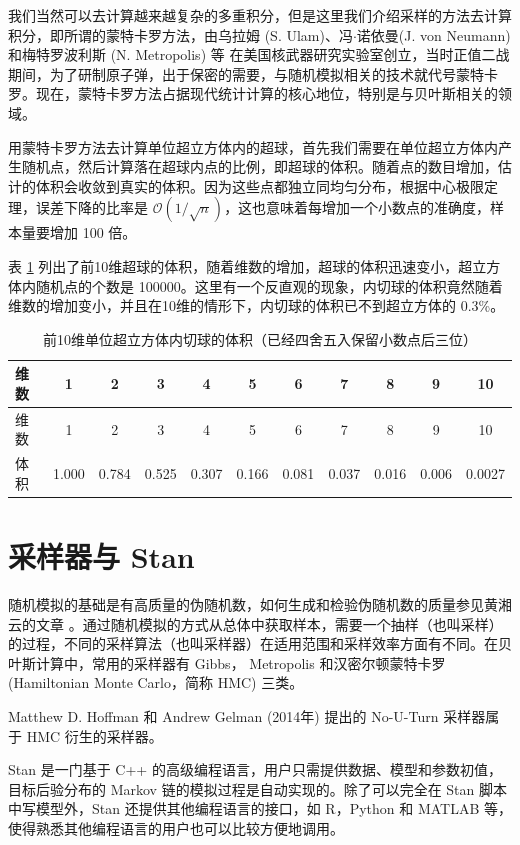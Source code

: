 \documentclass[12pt,a4paper,UTF8,twoside]{book}
\theoremstyle{definition}
\theoremstyle{definition}
\theoremstyle{definition}
\theoremstyle{remark}
\begin{document}
我们当然可以去计算越来越复杂的多重积分，但是这里我们介绍采样的方法去计算积分，即所谓的蒙特卡罗方法，由乌拉姆
(S. Ulam)、冯\(\cdot\)诺依曼(J. von Neumann) 和梅特罗波利斯 (N.
Metropolis) 等
在美国核武器研究实验室创立，当时正值二战期间，为了研制原子弹，出于保密的需要，与随机模拟相关的技术就代号蒙特卡罗。现在，蒙特卡罗方法占据现代统计计算的核心地位，特别是与贝叶斯相关的领域。

用蒙特卡罗方法去计算单位超立方体内的超球，首先我们需要在单位超立方体内产生随机点，然后计算落在超球内点的比例，即超球的体积。随着点的数目增加，估计的体积会收敛到真实的体积。因为这些点都独立同均匀分布，根据中心极限定理，误差下降的比率是
\(\mathcal{O}\left( 1 / \sqrt{n} \right)\)，这也意味着每增加一个小数点的准确度，样本量要增加
100 倍。

表 \ref{tab:calculate-volume-of-hyperball}
列出了前10维超球的体积，随着维数的增加，超球的体积迅速变小，超立方体内随机点的个数是
100000。这里有一个反直观的现象，内切球的体积竟然随着维数的增加变小，并且在10维的情形下，内切球的体积已不到超立方体的
0.3\%。

\begin{longtable}[]{@{}lcccccccccc@{}}
\caption{\label{tab:calculate-volume-of-hyperball}
前10维单位超立方体内切球的体积（已经四舍五入保留小数点后三位）}\tabularnewline
\toprule
维数 & 1 & 2 & 3 & 4 & 5 & 6 & 7 & 8 & 9 & 10\tabularnewline
\midrule
\endfirsthead
\toprule
维数 & 1 & 2 & 3 & 4 & 5 & 6 & 7 & 8 & 9 & 10\tabularnewline
\midrule
\endhead
体积 & 1.000 & 0.784 & 0.525 & 0.307 & 0.166 & 0.081 & 0.037 & 0.016 &
0.006 & 0.0027\tabularnewline
\bottomrule
\end{longtable}

\hypertarget{Samplers}{%
\section{采样器与 Stan}\label{Samplers}}

随机模拟的基础是有高质量的伪随机数，如何生成和检验伪随机数的质量参见黄湘云的文章
\citep{Huang2017COS}。通过随机模拟的方式从总体中获取样本，需要一个抽样（也叫采样）的过程，不同的采样算法（也叫采样器）在适用范围和采样效率方面有不同。在贝叶斯计算中，常用的采样器有
Gibbs， Metropolis 和汉密尔顿蒙特卡罗 (Hamiltonian Monte Carlo，简称
HMC) 三类。

Matthew D. Hoffman 和 Andrew Gelman (2014年) \citep{hoffman2014} 提出的
No-U-Turn 采样器属于 HMC 衍生的采样器。

Stan 是一门基于 C++
的高级编程语言，用户只需提供数据、模型和参数初值，目标后验分布的 Markov
链的模拟过程是自动实现的。除了可以完全在 Stan 脚本中写模型外，Stan
还提供其他编程语言的接口，如 R，Python 和 MATLAB
等，使得熟悉其他编程语言的用户也可以比较方便地调用。
\end{document}
